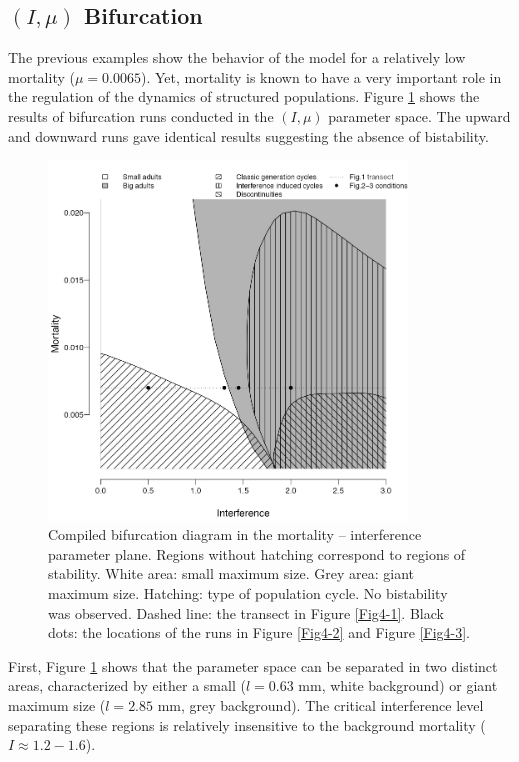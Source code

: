 \subsection{\texorpdfstring{$(I,\mu)$}{(I,mu)} Bifurcation}

The previous examples show the behavior of the model for a relatively low
mortality ($\mu=0.0065$). Yet, mortality is known to have a very important role
in the regulation of the dynamics of structured populations. Figure \ref{Fig4-4}
shows the results of bifurcation runs conducted in the $(I,\mu)$ parameter
space. The upward and downward runs gave identical results suggesting the
absence of bistability.

\begin{figure}[!ht] %
\centering
\includegraphics[width=0.85\textwidth]{4_ChapThe1/Fig/Fig4.pdf}
\caption[$(I,\mu)$ stability
diagram]{Compiled bifurcation diagram in the mortality -- interference
parameter plane. Regions without hatching correspond to regions of stability. White area:
small maximum size. Grey area: giant maximum size. Hatching: type of population
cycle. No bistability was observed. Dashed line: the transect in Figure
\ref{Fig4-1}. Black dots: the locations of the runs in Figure \ref{Fig4-2} and
Figure \ref{Fig4-3}.}
\label{Fig4-4}
\end{figure}

First, Figure \ref{Fig4-4} shows that the parameter space can be separated in
two distinct areas, characterized by either a small ($l=0.63$ mm, white
background) or giant maximum size ($l=2.85$ mm, grey background). The critical
interference level separating these regions is relatively insensitive to the
background mortality ($I \approx 1.2-1.6$).

